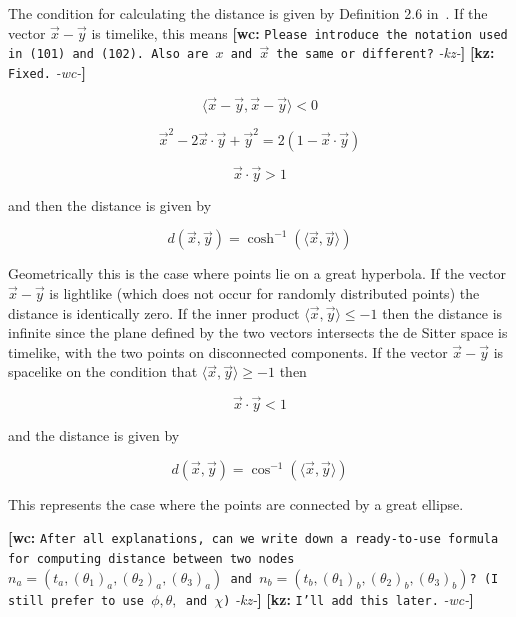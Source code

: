 \documentclass[preprint,notitlepage,amsmath,amssymb,floatfix]{revtex4-1}
\newcommand{\XXX}[3]{{\bf [#1: } {\tt #3} {\it -#2-}{\bf ]}}
\begin{document}
The condition for calculating the distance is given by Definition 2.6 in~\cite{ref:asmus2009}.
If the vector $\vec{x}-\vec{y}$ is timelike, this means \XXX{wc}{kz}{Please introduce the notation used in (101) and (102). Also are $x$ and $\vec x$ the same or different?} \XXX{kz}{wc}{Fixed.}

\begin{equation}
\langle\vec x - \vec y,\vec x - \vec y\rangle < 0
\end{equation}

\begin{equation}
\vec{x}^2 - 2\vec{x}\cdot\vec{y} + \vec{y}^2 = 2\left(1-\vec{x}\cdot\vec{y}\right)
\end{equation}

\begin{equation}
\vec{x}\cdot\vec{y} > 1
\end{equation}

\noindent and then the distance is given by

\begin{equation}
d(\vec{x},\vec{y}) = \cosh^{-1}(\langle \vec{x}, \vec{y}\rangle)
\end{equation}

\noindent Geometrically this is the case where points lie on a great hyperbola.  
If the vector $\vec{x}-\vec{y}$ is lightlike (which does not occur for randomly distributed points) the distance is identically zero.  
If the inner product $\langle \vec{x},\vec{y}\rangle \leq -1$ then the distance is infinite since the plane defined by the two vectors intersects the de Sitter space is timelike, with the two points on disconnected components.  
If the vector $\vec{x}-\vec{y}$ is spacelike on the condition that $\langle \vec{x},\vec{y}\rangle \geq -1$ then

\begin{equation}
\vec{x}\cdot\vec{y} < 1
\end{equation}

\noindent and the distance is given by

\begin{equation}
d(\vec{x},\vec{y}) = \cos^{-1}(\langle \vec{x},\vec{y}\rangle)
\end{equation}

\noindent This represents the case where the points are connected by a great ellipse.

\XXX{wc}{kz}{After all explanations, can we write down a ready-to-use formula for computing distance between two nodes $n_a=(t_a,(\theta_1)_a,(\theta_2)_a,(\theta_3)_a)$  and $n_b=(t_b,(\theta_1)_b,(\theta_2)_b,(\theta_3)_b)$? (I still prefer to use $\phi, \theta,$ and $\chi$)} \XXX{kz}{wc}{I'll add this later.}
\end{document}
